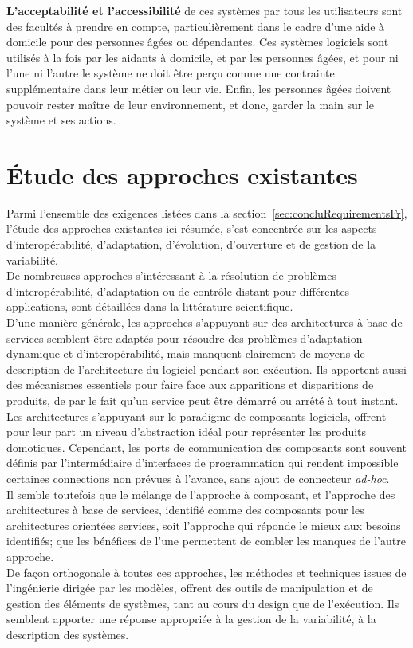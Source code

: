 {\bf L'acceptabilité et l'accessibilité} de ces systèmes par tous les utilisateurs sont des facultés à prendre en compte, particulièrement dans le cadre d'une aide à domicile pour des personnes âgées ou dépendantes. Ces systèmes logiciels sont utilisés à la fois par les aidants à domicile, et par les personnes âgées, et pour ni l'une ni l'autre le système ne doit être perçu comme une contrainte supplémentaire dans leur métier ou leur vie. Enfin, les personnes âgées doivent pouvoir rester maître de leur environnement, et donc, garder la main sur le système et ses actions.\\


\section{Étude des approches existantes}

Parmi l'ensemble des exigences listées dans la section~\ref{sec:concluRequirementsFr}, l'étude des approches existantes ici résumée, s'est concentrée sur les aspects d'interopérabilité, d'adaptation, d'évolution, d'ouverture et de gestion de la variabilité.\\

De nombreuses approches s'intéressant à la résolution de problèmes d'interopérabilité, d'adaptation ou de contrôle distant pour différentes applications, sont détaillées dans la littérature scientifique.\\
D'une manière générale, les approches s'appuyant sur des architectures à base de services semblent être adaptés pour résoudre des problèmes d'adaptation dynamique et d'interopérabilité, mais manquent clairement de moyens de description de l'architecture du logiciel pendant son exécution. Ils apportent aussi des mécanismes essentiels pour faire face aux apparitions et disparitions de produits, de par le fait qu'un service peut être démarré ou arrêté à tout instant.\\
Les architectures s'appuyant sur le paradigme de composants logiciels, offrent pour leur part un niveau d'abstraction idéal pour représenter les produits domotiques. Cependant, les ports de communication des composants sont souvent définis par l'intermédiaire d'interfaces de programmation qui rendent impossible certaines connections non prévues à l'avance, sans ajout de connecteur {\it ad-hoc}.\\
Il semble toutefois que le mélange de l'approche à composant, et l'approche des architectures à base de services, identifié comme des composants pour les architectures orientées services, soit l'approche qui réponde le mieux aux besoins identifiés; que les bénéfices de l'une permettent de combler les manques de l'autre approche.\\
De façon orthogonale à toutes ces approches, les méthodes et techniques issues de l'ingénierie dirigée par les modèles, offrent des outils de manipulation et de gestion des éléments de systèmes, tant au cours du design que de l'exécution. Ils semblent apporter une réponse appropriée à la gestion de la variabilité, à la description des systèmes.\\

